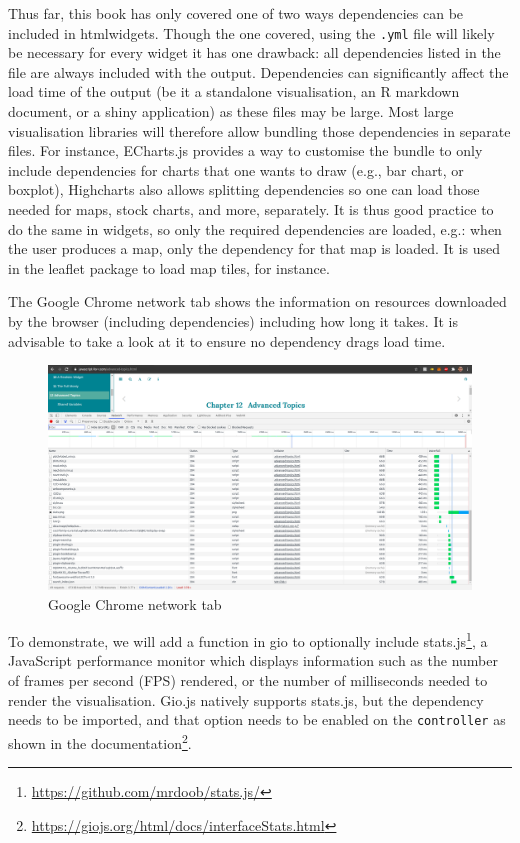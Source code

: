 \documentclass[
]{krantz}
\renewcommand{\href}[2]{#2\footnote{\url{#1}}}
\begin{document}
Thus far, this book has only covered one of two ways dependencies can be included in htmlwidgets. Though the one covered, using the \texttt{.yml} file will likely be necessary for every widget it has one drawback: all dependencies listed in the file are always included with the output. Dependencies can significantly affect the load time of the output (be it a standalone visualisation, an R markdown document, or a shiny application) as these files may be large. Most large visualisation libraries will therefore allow bundling those dependencies in separate files. For instance, ECharts.js provides a way to customise the bundle to only include dependencies for charts that one wants to draw (e.g., bar chart, or boxplot), Highcharts also allows splitting dependencies so one can load those needed for maps, stock charts, and more, separately. It is thus good practice to do the same in widgets, so only the required dependencies are loaded, e.g.: when the user produces a map, only the dependency for that map is loaded. It is used in the leaflet package to load map tiles, for instance.

The Google Chrome network tab shows the information on resources downloaded by the browser (including dependencies) including how long it takes. It is advisable to take a look at it to ensure no dependency drags load time.

\begin{figure}[t]

{\centering \includegraphics[width=1\linewidth]{images/htmlwidgets-performances} 

}

\caption{Google Chrome network tab}\label{fig:htmlwidgets-performances}
\end{figure}

To demonstrate, we will add a function in gio to optionally include \href{https://github.com/mrdoob/stats.js/}{stats.js}, a JavaScript performance monitor which displays information such as the number of frames per second (FPS) rendered, or the number of milliseconds needed to render the visualisation. Gio.js natively supports stats.js, but the dependency needs to be imported, and that option needs to be enabled on the \texttt{controller} as shown in the \href{https://giojs.org/html/docs/interfaceStats.html}{documentation}.
\end{document}
